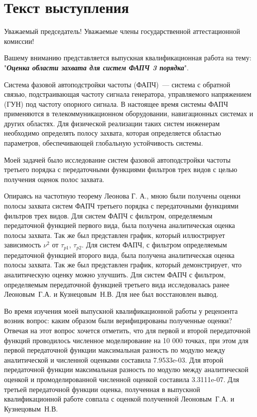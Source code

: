 \documentclass[a4paper,article,14pt]{extarticle}
\begin{document}
\section*{Текст выступления}
Уважаемый председатель! Уважаемые члены государственной аттестационной комиссии!

Вашему вниманию представляется выпускная квалификационная работа  на тему: "\textbf{\textit{Оценка области захвата для систем ФАПЧ 3 порядка}}". 

Система фазовой автоподстройки частоты (ФАПЧ)~--- система с обратной связью, подстраивающая частоту сигнала генератора, управляемого напряжением (ГУН) под частоту опорного сигнала. В настоящее время системы ФАПЧ применяются в телекоммуникационном оборудовании, навигационных системах и других областях. Для физической реализации таких систем инженерам необходимо определять полосу захвата, которая определяется областью параметров, обеспечивающей глобальную устойчивость системы. 

Моей задачей было исследование систем фазовой автоподстройки частоты третьего порядка с передаточными функциями фильтров трех видов с целью получения оценок полос захвата.

Опираясь на частотную теорему Леонова Г. А., мною были получены оценки полосы захвата систем ФАПЧ третьего порядка с передаточными функциями фильтров трех видов. Для систем ФАПЧ с фильтром, определяемым передаточной функцией первого вида, была получена аналитическая оценка полосы захвата. Так же был представлен график, который иллюстрирует зависимость $\nu^2$ от $\tau_{p1}$, $\tau_{p2}$. Для систем ФАПЧ, с фильтром определяемым передаточной функцией второго вида, была получена аналитическая оценка полосы захвата. Так же был представлен график, который демонстрирует, что аналитическую оценку можно улучшить. Для систем ФАПЧ с фильтром, определяемым передаточной функцией третьего вида исследовалась ранее Леоновым~Г.\:А. и Кузнецовым~Н.\:В. Для нее был восстановлен вывод.

Во время изучения моей выпускной квалификационной работы у рецензента возник вопрос: каким образом были верифицированы полученные оценки? Отвечая на этот вопрос хочется отметить, что для первой и второй передаточной функций проводилось численное моделирование на 10 000 точках, при этом для первой передаточной функции максимальная разность по модулю между аналитической  и численной оценками составила 7.9533e-03. Для второй передаточной функции максимальная разность по модулю между аналитической оценкой и промоделированной численной оценкой составила 3.3111e-07. Для третьей передаточной функции оценка, полученная в выпускной квалификационной работе совпала с оценкой полученной Леоновым~Г.\:А. и Кузнецовым~Н.\:В.
\end{document}
